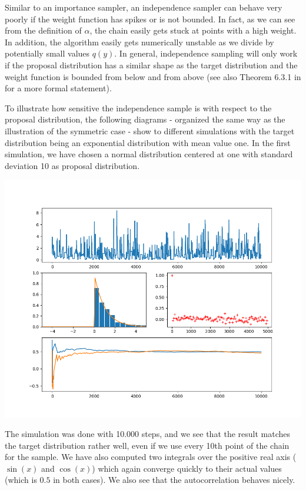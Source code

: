 \documentclass[a4paper, draft]{article}
\theoremstyle{own}
\theoremstyle{remark}
\begin{document}
Similar to an importance sampler, an independence sampler can behave very poorly
if the weight function has spikes or is not bounded. In fact, as we can see from the definition of $\alpha$, the chain easily gets stuck at points with a high weight. In addition, the algorithm easily gets numerically unstable as we divide by potentially small values $q(y)$. In general, independence sampling will only work if the proposal distribution has a similar shape as the target distribution and the weight function is bounded from below and from above (see also Theorem 6.3.1 in \cite{RobertCasella1999} for a more formal statement).

To illustrate how sensitive the independence sample is with respect to the proposal distribution, the following diagrams - organized the same way as the illustration of the symmetric case - show to different simulations with the target distribution being an exponential distribution with mean value one. In the first simulation, we have chosen a normal distribution centered at one with standard deviation 10 as proposal distribution.

\includegraphics[scale=.45]{MetropolisIndependentGood.png}

The simulation was done with 10.000 steps, and we see that the result matches the target distribution rather well, even if we use every 10th point of the chain for the sample. We have also computed two integrals over the positive real axis ($\sin(x)$ and $\cos(x)$) which again converge quickly to their actual values (which is $0.5$ in both cases). We also see that the autocorrelation behaves nicely.
\end{document}
